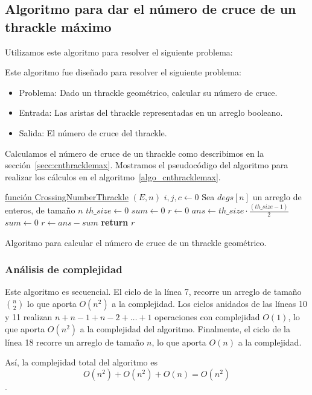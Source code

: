 \subsection{Algoritmo para dar el número de cruce de un thrackle máximo}
  \label{secc:algo_cnthracklemax}
  Utilizamos este algoritmo para resolver el siguiente problema:

  Este algoritmo fue diseñado para resolver el siguiente problema:
  \begin{itemize}
    \item[] Problema: Dado un thrackle geométrico, calcular su número de cruce.
    \item[] Entrada: Las aristas del thrackle representadas en un arreglo booleano.
    \item[] Salida: El número de cruce del thrackle.
  \end{itemize}

  Calculamos el número de cruce de un thrackle como describimos en la sección~\ref{secc:cnthracklemax}. Mostramos el pseudocódigo del algoritmo para realizar los cálculos en el algoritmo~\ref{algo_cnthracklemax}.

  \begin{algorithm}[b]
    \DontPrintSemicolon
    \underline{función CrossingNumberThrackle} $(E,n)$\;
     $i,j,c \gets 0$\;
     Sea $degs[n]$ un arreglo de enteros, de tamaño $n$\;
     $th\_size \gets 0$\;
     $sum \gets 0$\;
     $r \gets 0$\;
     $ans \gets th\_size\cdot \frac{(th\_size-1)}{2}$\;
     $sum \gets 0$\;
     $r \gets ans-sum$\;
     \textbf{return} $r$\;
    \caption{Algoritmo para calcular el número de cruce de un thrackle geométrico.}
    \label{algo_cnthracklemax}
  \end{algorithm}

  \subsubsection{Análisis de complejidad}

  Este algoritmo es secuencial. El ciclo de la línea 7, recorre un arreglo de tamaño
  $\binom{n}{2}$ lo que aporta $O(n^2)$ a la complejidad. Los ciclos anidados de las
  líneas 10 y 11 realizan $n + n-1 + n-2 + \dots + 1$ operaciones con complejidad $O(1)$,
  lo que aporta $O(n^2)$  a la complejidad del algoritmo. Finalmente, el ciclo de la
  línea 18 recorre un arreglo de tamaño $n$, lo que aporta $O(n)$ a la complejidad.

  Así, la complejidad total del algoritmo es \[ O(n^2) + O(n^2) + O(n) = O(n^2)\].
